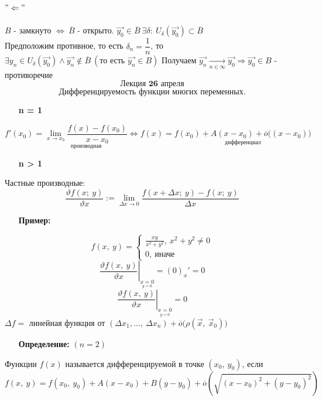 \documentclass[12pt, letterpaper, twoside]{article}
\begin{document}
\subsection*{$"\Leftarrow"$}
$B$ - замкнуто $\Leftrightarrow\ \overline{B}$ - открыто. \quad $\vec{y_0}\in \overline{B}\ \exists \delta:\ U_\delta(\vec{y_0})\subset \overline{B}$\\
Предположим противное, то есть $\delta_n = \dfrac{1}{n}$, то $\exists y_n\in U_\delta(\vec{y_0}) \wedge \vec{y_n} \notin \overline{B}\ (\text{то есть } \vec{y_n}\in B)$
Получаем $\vec{y_n} \underset{n\in\infty}{\longrightarrow} \vec{y_0}\Rightarrow \vec{y_0}\in B$ - противоречие\newpage
    \[\textbf{Лекция 26 апреля}\]
    \[\text{Дифференцируемость функции многих переменных.}\]
    \begin{enumerate}
        \item[\textbf{n = 1}]
    \end{enumerate}
    \[f'(x_0) = \underset{\text{производная}}{\lim_{x\to x_0} \frac{f(x) - f(x_0)}{x - x_0}}\Leftrightarrow f(x) = \underset{\text{дифференциал}}{f(x_0) + A(x - x_0) + \overline{o}\big((x - x_0)\big)}\]
    \begin{enumerate}
        \item[\textbf{n > 1}]
    \end{enumerate}
    Частные производные:
    \[\frac{\vartheta f(x;\ y)}{\vartheta x} := \lim_{\Delta x\to 0} \frac{f(x + \Delta x;\ y) - f(x;\ y)}{\Delta x}\]
    \begin{enumerate}
        \item[\textbf{Пример:}]
    \end{enumerate}
    \[f(x,\ y) = \begin{cases}
        \frac{xy}{x^2 + y^2},\ x^2 + y^2 \neq 0\\
        0,\ \text{иначе}
    \end{cases}\]
    \[\left. \frac{\vartheta f(x,\ y)}{\vartheta x}\right|_{\underset{y = 0}{x = 0}} = (0)_x' = 0\]
    \[\left. \frac{\vartheta f(x,\ y)}{\vartheta x} \right|_{\underset{y = 0}{x = 0}} = 0\]
    $\varDelta f =$ линейная функция от $(\Delta x_1,\dots,\ \Delta x_n) + \overline{o}\big(\rho(\vec{x},\ \vec{x}_0)\big)$
    \begin{enumerate}
        \item[\textbf{Определение:}] $(n = 2)$
    \end{enumerate}
    Функции $f(x)$ называется дифференцируемой в точке $(x_0,\ y_0)$, если
    \[f(x,\ y) = f(x_0,\ y_0) + A(x - x_0) + B(y - y_0) + \overline{o}\left( \sqrt{(x - x_0)^2 + (y - y_0)^2} \right)\]\newpage
\end{document}
